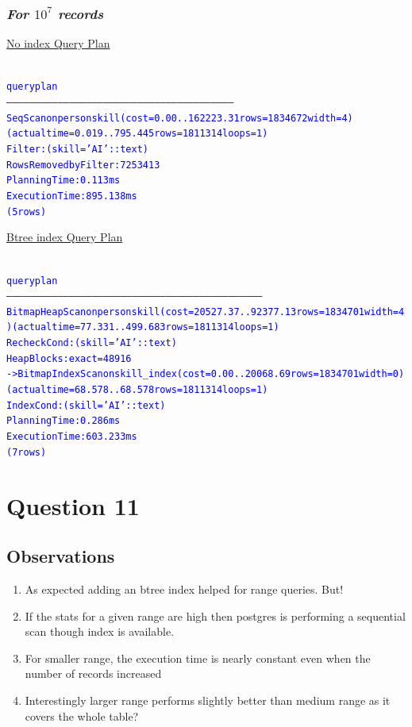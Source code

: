 \documentclass{article}
\begin{document}
    \subsubsection*{\emph{For $10^7$ records}}
    \underline{No index Query Plan}
    \begin{center}
      {\tiny
      \begin{alltt}
      \textcolor{blue}{
        queryplan                                                        
        ------------------------------------------------------------------------------------------------------------------------
         Seq Scan on personskill  (cost=0.00..162223.31 rows=1834672 width=4) (actual time=0.019..795.445 rows=1811314 loops=1)
           Filter: (skill = 'AI'::text)
           Rows Removed by Filter: 7253413
         Planning Time: 0.113 ms
         Execution Time: 895.138 ms
        (5 rows)
       }
      \end{alltt}
      }
    \end{center}
    \underline{Btree index Query Plan}
    \begin{center}
      {\tiny
      \begin{alltt}
      \textcolor{blue}{
        queryplan                                                               
        --------------------------------------------------------------------------------------------------------------------------------------
         Bitmap Heap Scan on personskill  (cost=20527.37..92377.13 rows=1834701 width=4) (actual time=77.331..499.683 rows=1811314 loops=1)
           Recheck Cond: (skill = 'AI'::text)
           Heap Blocks: exact=48916
           ->  Bitmap Index Scan on skill_index  (cost=0.00..20068.69 rows=1834701 width=0) (actual time=68.578..68.578 rows=1811314 loops=1)
                 Index Cond: (skill = 'AI'::text)
         Planning Time: 0.286 ms
         Execution Time: 603.233 ms
        (7 rows)
       }
      \end{alltt}
      }
    \end{center}

    \section*{Question 11}
    \subsection*{Observations}
    \begin{enumerate}
      \item As expected adding an btree index helped for range queries. But!
      \item If the stats for a given range are high then postgres is performing a sequential scan though index is available.
      \item For smaller range, the execution time is nearly constant even when the number of records increased
      \item Interestingly larger range performs slightly better than medium range as it covers the whole table?
    \end{enumerate}
\end{document}
